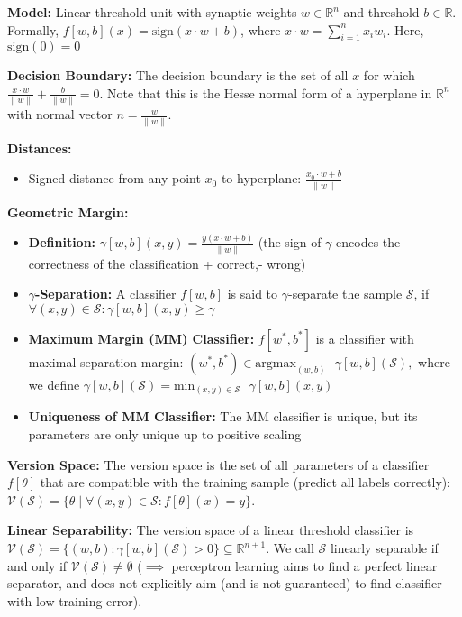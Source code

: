 \textbf{Model:} Linear threshold unit with synaptic weights $w \in \mathbb{R}^n$ and threshold $b \in \mathbb{R}$. Formally, $f[w, b](x) = \text{sign}(x \cdot w + b)$, where $x \cdot w = \sum_{i=1}^n x_iw_i$. Here, $\text{sign}(0) = 0$


\textbf{Decision Boundary:} The decision boundary is the set of all $x$ for which $\frac{x \cdot w} {\lVert w\rVert} + \frac{b} {\lVert w\rVert} = 0$. Note that this is the Hesse normal form of a hyperplane in $\mathbb{R}^n$ with normal vector $n = \frac{w} {\lVert w\rVert}$.


\textbf{Distances:} 
\begin{itemize}
    \item Signed distance from any point $x_0$ to hyperplane: $\frac{x_0 \cdot w + b }{\lVert w \rVert}$
\end{itemize}

\textbf{Geometric Margin:} 
\begin{itemize}
    \item \textbf{Definition:} $\gamma[w, b](x, y) = \frac{y(x \cdot w + b)}{\lVert w \rVert}$ (the sign of  $\gamma$ encodes the correctness of the classification + correct,- wrong)
    \item \textbf{$\gamma$-Separation: } A classifier $f[w, b]$ is said to $\gamma$-separate the sample $\mathcal{S}$, if $\forall (x, y)\in \mathcal{S}: \gamma[w, b](x, y) \geq \gamma$
    \item \textbf{Maximum Margin (MM) Classifier:} $f[w^*, b^*]$ is a classifier with maximal separation margin: $(w^*, b^*) \in \mathrm{arg max}_{(w, b)}\text{ }\gamma[w, b] (\mathcal{S}),$ where we define $\gamma[w, b](\mathcal{S}) = \mathrm{min}_{(x, y)\in \mathcal{S}}\text{ } \gamma[w, b](x, y)$
    \item \textbf{Uniqueness of MM Classifier: } The MM classifier is unique, but its parameters are only unique up to positive scaling
\end{itemize}


\textbf{Version Space:} The version space is the set of all parameters of a classifier $f[\theta]$ that are compatible with the training sample (predict all labels correctly): $\mathcal{V}(\mathcal{S}) = \{\theta \;|\; \forall(x, y)\in \mathcal{S}: f[\theta](x) = y\}$. 



\textbf{Linear Separability:} The version space of a linear threshold classifier is $\mathcal{V}(\mathcal{S}) = \{(w, b): \gamma[w, b](\mathcal{S}) > 0 \}\subseteq \mathbb{R}^{n + 1}$. We call $\mathcal{S}$ linearly separable if and only if $\mathcal{V}(\mathcal{S}) \neq \emptyset$ ($\implies$ perceptron learning aims to find a perfect linear separator, and does not explicitly aim (and is not guaranteed) to find classifier with low training error).


